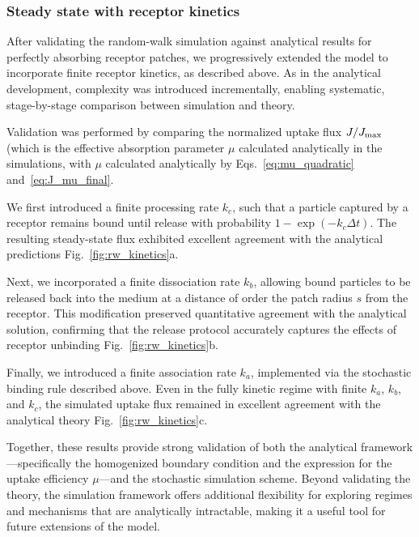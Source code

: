 \subsubsection{Steady state with receptor kinetics}\label{sec:rw_kinetics}
After validating the random-walk simulation against analytical results for perfectly absorbing receptor patches, we progressively extended the model to incorporate finite receptor kinetics, as described above.
As in the analytical development, complexity was introduced incrementally, enabling systematic, stage-by-stage comparison between simulation and theory.

Validation was performed by comparing the normalized uptake flux $J/J_{\mathrm{max}}$ (which is the effective absorption parameter $\mu$ calculated analytically in the simulations, with $\mu$ calculated analytically by Eqs.~\eqref{eq:mu_quadratic} and~\eqref{eq:J_mu_final}.

We first introduced a finite processing rate $k_c$, such that a particle captured by a receptor remains bound until release with probability $1 - \exp(-k_c \Delta t)$.
The resulting steady-state flux exhibited excellent agreement with the analytical predictions Fig.~\ref{fig:rw_kinetics}a.

Next, we incorporated a finite dissociation rate $k_b$, allowing bound particles to be released back into the medium at a distance of order the patch radius $s$ from the receptor.
This modification preserved quantitative agreement with the analytical solution, confirming that the release protocol accurately captures the effects of receptor unbinding Fig.~\ref{fig:rw_kinetics}b.

Finally, we introduced a finite association rate $k_a$, implemented via the stochastic binding rule described above.
Even in the fully kinetic regime with finite $k_a$, $k_b$, and $k_c$, the simulated uptake flux remained in excellent agreement with the analytical theory Fig.~\ref{fig:rw_kinetics}c.

Together, these results provide strong validation of both the analytical framework---specifically the homogenized boundary condition and the expression for the uptake efficiency $\mu$---and the stochastic simulation scheme.
Beyond validating the theory, the simulation framework offers additional flexibility for exploring regimes and mechanisms that are analytically intractable, making it a useful tool for future extensions of the model.


